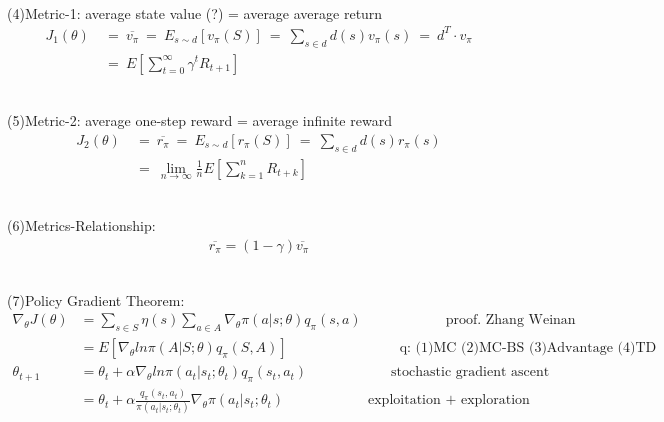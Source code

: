 \documentclass{article}
\begin{document}
~ \\[3pt]
(4)Metric-1: average state value (?) = average average return 
\begin{align*}
    J_{1} (\theta) & \ = \ \overline{v_{\pi}} 
                     \ = \ E_{s \sim d} [ v_{\pi}(S) ] 
                     \ = \ \sum_{s \in d} d(s) v_{\pi}(s) 
                     \ = \ d^{T} \cdot v_{\pi} \\[3pt]
                   & \ = \ E \left[ \sum_{t = 0}^{\infty} 
                                    \gamma^{t} R_{t+1} \right] 
\end{align*}

~ \\[3pt]
(5)Metric-2: average one-step reward = average infinite reward 
\begin{align*}
    J_{2} (\theta) & \ = \ \overline{r_{\pi}} 
                     \ = \ E_{s \sim d} [ r_{\pi}(S) ] 
                     \ = \ \sum_{s \in d} d(s) r_{\pi}(s) \\[3pt]
                   & \ = \ \lim_{n \to \infty} \frac{1}{n} 
                     E \left[ \sum_{k = 1}^{n} R_{t+k} \right] 
\end{align*}

~ \\[3pt]
(6)Metrics-Relationship: 
\begin{align*}
    \overline{r_{\pi}} = (1 - \gamma) \overline{v_{\pi}} 
\end{align*}

~ \\[3pt]
(7)Policy Gradient Theorem: 
\begin{align*}
    \nabla_{\theta} J(\theta) &= \sum_{s \in S} \eta (s) 
    \sum_{a \in A} \nabla_{\theta} \pi (a | s; \theta) q_{\pi} (s, a) 
    \qquad \qquad \qquad \text{proof. Zhang Weinan} \\[3pt]
    &= E \left[ \nabla_{\theta} ln \pi (A | S; \theta) q_{\pi} (S, A) \right] 
    \qquad \qquad \qquad \qquad 
    \text{q: (1)MC   (2)MC-BS   (3)Advantage   (4)TD} \\[3pt]
    \theta_{t+1} &= \theta_{t} + \alpha \nabla_{\theta} 
                    ln \pi (a_{t} | s_{t}; \theta_{t}) q_{\pi} (s_{t}, a_{t}) 
                    \qquad \qquad \qquad \text{stochastic gradient ascent} \\[3pt]
                 &= \theta_{t} + \alpha 
                 \frac{q_{\pi} (s_{t}, a_{t})}{\pi (a_{t} | s_{t}; \theta_{t})} 
                 \nabla_{\theta} \pi (a_{t} | s_{t}; \theta_{t}) 
                 \qquad \qquad \qquad \text{exploitation + exploration} 
\end{align*}
\end{document}
